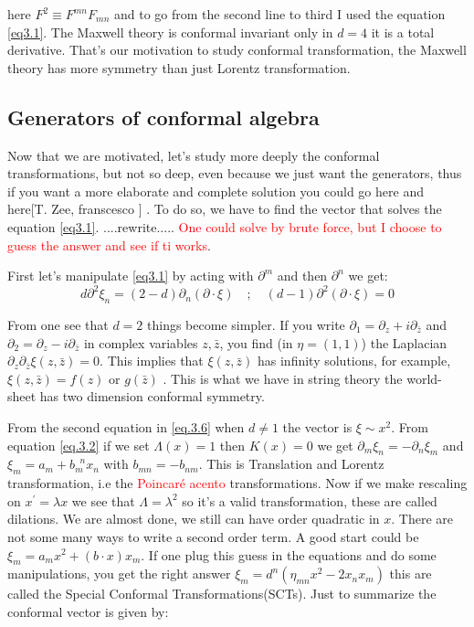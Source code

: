 here $F^{2} \equiv F^{mn}F_{mn}$ and to go from the second line to third I used the equation \eqref{eq3.1}. The Maxwell theory is conformal invariant only in $d=4$ it is a total derivative. That's our motivation to study conformal transformation, the Maxwell theory has more symmetry than just Lorentz transformation.
\subsection{Generators of conformal algebra}

Now that we are motivated, let's study  more deeply  the conformal transformations, but not so deep, even because we just want the generators, thus if you want a more elaborate and complete solution you could go here and here[T. Zee, franscesco ]  . To do so,  we have to find the  vector that solves the equation \eqref{eq3.1}.
....rewrite..... \textcolor{red}{One could solve by brute force, but I choose to guess the answer and see if ti works}.

First let's manipulate  \eqref{eq3.1} by acting with $\partial^{m}$ and then $\partial^{n}$ we get:
\begin{equation}
d\partial^{2} \xi_{n} = (2-d) \partial_{n}(\partial \cdot \xi) \quad ; \quad (d-1)\partial^{2}(\partial \cdot \xi)=0
\label{eq.3.6}
\end{equation} 


From  one see that $d=2$ things become simpler. If you write $\partial_{1} = \partial_{z} +i\partial_{\bar{z}} $ and $\partial_{2} = \partial_{z} -i\partial_{\bar{z}} $ in complex variables $z,\bar{z}$, you find (in $\eta=(1,1)$) the Laplacian $\partial_{z}\partial_{\bar{z}}\xi(z,\bar{z})= 0$. This implies that $\xi(z,\bar{z})$ has infinity solutions, for example, $\xi(z,\bar{z}) = f(z)$ or $g(\bar{z})$ . This is what we have in string theory the world-sheet has two dimension conformal symmetry.

From the second equation in \eqref{eq.3.6} when $d\neq 1$ the vector is $\xi \sim x^{2}$. From equation \eqref{eq.3.2} if we set $\Lambda(x) = 1$ then $K(x) = 0$  we get $\partial_{m}\xi_{n} =- \partial_{n}\xi_{m}$ and $\xi_{m} = a_{m} + b_{m}^{\;\;n}x_{n}$ with $b_{mn} = -b_{nm}$. This is Translation and Lorentz transformation, i.e the \textcolor{red}{Poincaré acento} transformations. Now if we make rescaling on $x^{'} = \lambda x$ we see that $\Lambda =\lambda^{2} $ so it's a valid transformation, these are called dilations. We are almost done, we still can have order quadratic in $x$. There are not some many ways to write a second order term. A good start could be $\xi_{m} = a_{m}x^{2} + (b\cdot x)x_{m}$. If one plug this guess in the equations and do some manipulations, you get the right answer  $\xi_{m} = d^{n}(\eta_{mn}x^{2} -  2x_{n}x_{m})$ this are called the Special Conformal Transformations(SCTs). Just to summarize the conformal vector is given by:

